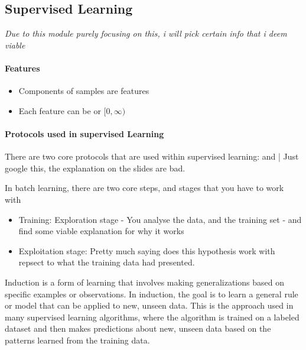 \subsection{Supervised Learning}
\textit{Due to this module purely focusing on this, i will pick certain info that i deem viable}\\

\paragraph{Features}
\begin{itemize}
	\item Components of samples are features
	\item Each feature can be  or  $ [0, \infty )$
\end{itemize}

\paragraph{Protocols used in supervised Learning}
There are two core protocols that are used within supervised learning:
 and  | Just google this, the explanation on the slides are bad.

In batch learning, there are two core steps, and stages that you have to work with
\begin{itemize}
	\item Training: Exploration stage - You analyse the data, and the training set - and find some viable explanation for why it works
	\item Exploitation stage: Pretty much saying does this hypothesis work with repsect to what the training data had presented.
\end{itemize}

\begin{definition}[Induction]
	Induction is a form of learning that involves making generalizations based on specific examples or observations. In induction, the goal is to learn a general rule or model that can be applied to new, unseen data. This is the approach used in many supervised learning algorithms, where the algorithm is trained on a labeled dataset and then makes predictions about new, unseen data based on the patterns learned from the training data.

\end{definition}

